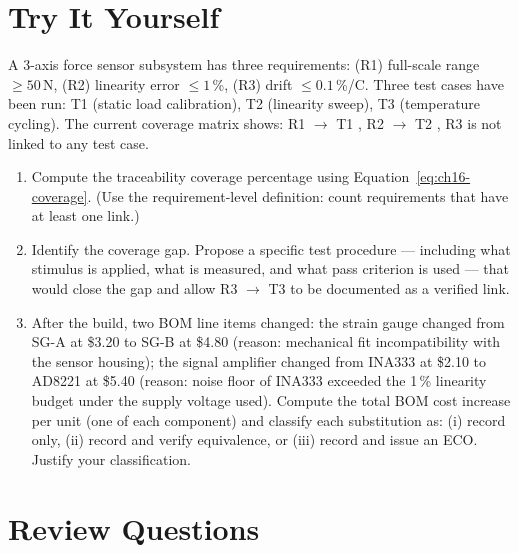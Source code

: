 \section*{Try It Yourself}
\label{sec:ch16-try}

A 3-axis force sensor subsystem has three requirements: (R1) full-scale range
$\geq 50$\,N, (R2) linearity error $\leq 1$\,\%, (R3) drift $\leq 0.1$\,\%/\textdegree C.
Three test cases have been run: T1 (static load calibration), T2 (linearity
sweep), T3 (temperature cycling).
The current coverage matrix shows: R1 $\to$ T1 \checkmark, R2 $\to$ T2
\checkmark, R3 is not linked to any test case.

\begin{enumerate}
  \item[(a)] Compute the traceability coverage percentage using
        Equation~\ref{eq:ch16-coverage}.
        (Use the requirement-level definition: count requirements that have
        at least one link.)

  \item[(b)] Identify the coverage gap.
        Propose a specific test procedure --- including what stimulus is applied,
        what is measured, and what pass criterion is used --- that would close
        the gap and allow R3 $\to$ T3 to be documented as a verified link.

  \item[(c)] After the build, two BOM line items changed: the strain gauge
        changed from SG-A at \$3.20 to SG-B at \$4.80 (reason: mechanical fit
        incompatibility with the sensor housing); the signal amplifier changed
        from INA333 at \$2.10 to AD8221 at \$5.40 (reason: noise floor of
        INA333 exceeded the 1\,\% linearity budget under the supply voltage
        used).
        Compute the total BOM cost increase per unit (one of each component)
        and classify each substitution as: (i) record only, (ii) record and
        verify equivalence, or (iii) record and issue an ECO.
        Justify your classification.
\end{enumerate}

\section*{Review Questions}
\label{sec:ch16-review}

